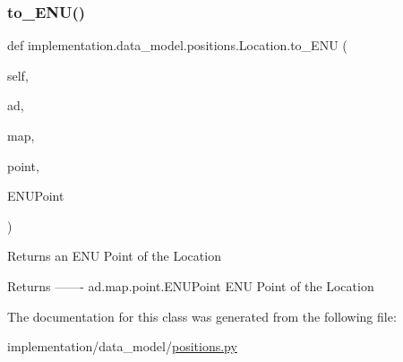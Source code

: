 \subsubsection{\texorpdfstring{to\+\_\+\+E\+N\+U()}{to\_ENU()}}
{\footnotesize\ttfamily def implementation.\+data\+\_\+model.\+positions.\+Location.\+to\+\_\+\+E\+NU (\begin{DoxyParamCaption}\item[{}]{self,  }\item[{}]{ad,  }\item[{}]{map,  }\item[{}]{point,  }\item[{}]{E\+N\+U\+Point }\end{DoxyParamCaption})}

\begin{DoxyVerb}Returns an ENU Point of the Location

Returns
-------
ad.map.point.ENUPoint
    ENU Point of the Location\end{DoxyVerb}
 

The documentation for this class was generated from the following file\+:\begin{DoxyCompactItemize}
\item 
implementation/data\+\_\+model/\hyperlink{positions_8py}{positions.\+py}\end{DoxyCompactItemize}
